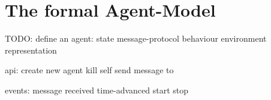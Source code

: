 \section{The formal Agent-Model}

TODO: define an agent:
state
message-protocol
behaviour
environment
representation

api:
create new agent
kill self
send message to

events:
message received
time-advanced
start
stop
